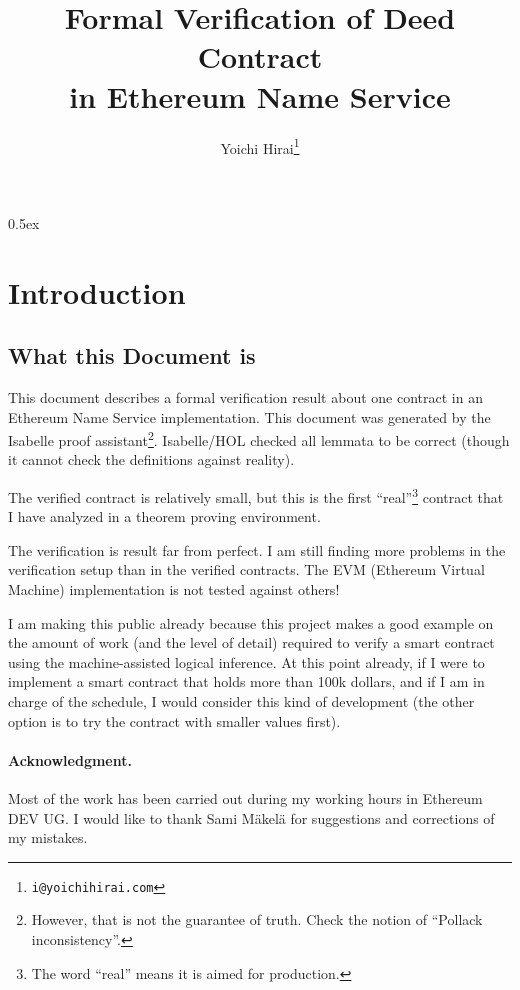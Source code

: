 \documentclass[11pt,a4paper]{article}
\begin{document}
\title{Formal Verification of Deed Contract\\in Ethereum Name Service}
\author{Yoichi Hirai\footnote{\texttt{i@yoichihirai.com}}}
\maketitle

\tableofcontents

\parindent 0pt\parskip 0.5ex

\midbreak

\section{Introduction}

\subsection{What this Document is}
This document describes a formal verification result about one contract in
an Ethereum Name Service implementation.
This document was generated by the Isabelle proof assistant\footnote{However, that is not the guarantee of truth.  Check the notion of ``Pollack inconsistency''.}.
Isabelle/HOL checked all lemmata to be correct (though it cannot check the definitions against reality).

The verified contract is relatively small,
but this is the first ``real''\footnote{The word ``real'' means it is aimed for production.}
contract that I have analyzed in a theorem proving environment.

The verification is result far from perfect.
I am still finding more problems in the verification setup than in the verified contracts.
The EVM (Ethereum Virtual Machine) implementation is not tested against others!

I am making this public already because this project makes a
good example on the amount of work (and the level of detail) required to
verify a smart contract using the machine-assisted logical inference.  At this
point already, if I were to
implement a smart contract that holds more than 100k dollars, and if
I am in charge of the schedule, I would consider this kind of
development (the other option is to try the contract with smaller values first).

\paragraph{Acknowledgment.}
Most of the work has been carried out during my working hours in Ethereum DEV UG.
I would like to thank Sami M\"akel\"a for suggestions and corrections of my mistakes.
\end{document}
